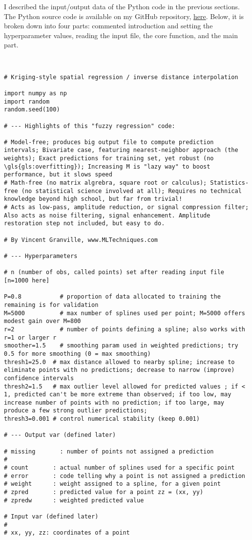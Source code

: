 \documentclass[oneside,10pt]{book}
\begin{document}
I described the input/output data of the Python code in the previous sections. The Python source code is available on my GitHub repository, \href{https://github.com/VincentGranville/Machine-Learning}{here}. Below, it is broken down into four parts: commented introduction and setting the hyperparameter values,
 reading the input file, the core function, and the main part.

\quad \\
{}

\begin{lstlisting}
# Kriging-style spatial regression / inverse distance interpolation

import numpy as np
import random
random.seed(100)

# --- Highlights of this "fuzzy regression" code:

# Model-free; produces big output file to compute prediction intervals; Bivariate case, featuring nearest-neighbor approach (the weights); Exact predictions for training set, yet robust (no \gls{gls:overfitting}); Increasing M is "lazy way" to boost performance, but it slows speed
# Math-free (no matrix algrebra, square root or calculus); Statistics-free (no statistical science involved at all); Requires no technical knowledge beyond high school, but far from trivial!
# Acts as low-pass, amplitude reduction, or signal compression filter; Also acts as noise filtering, signal enhancement. Amplitude restoration step not included, but easy to do.

# By Vincent Granville, www.MLTechniques.com

# --- Hyperparameters

# n (number of obs, called points) set after reading input file [n=1000 here]

P=0.8           # proportion of data allocated to training the remaining is for validation
M=5000          # max number of splines used per point; M=5000 offers modest gain over M=800
r=2             # number of points defining a spline; also works with r=1 or larger r
smoother=1.5    # smoothing param used in weighted predictions; try 0.5 for more smoothing (0 = max smoothing)
thresh1=25.0  # max distance allowed to nearby spline; increase to eliminate points with no predictions; decrease to narrow (improve) confidence intervals
thresh2=1.5   # max outlier level allowed for predicted values ; if < 1, predicted can't be more extreme than observed; if too low, may increase number of points with no prediction; if too large, may produce a few strong outlier predictions;
thresh3=0.001 # control numerical stability (keep 0.001)

# --- Output var (defined later)

# missing       : number of points not assigned a prediction
#
# count       : actual number of splines used for a specific point
# error       : code telling why a point is not assigned a prediction
# weight      : weight assigned to a spline, for a given point
# zpred       : predicted value for a point zz = (xx, yy)
# zpredw      : weighted predicted value

# Input var (defined later)
#
# xx, yy, zz: coordinates of a point
\end{lstlisting}
\end{document}
